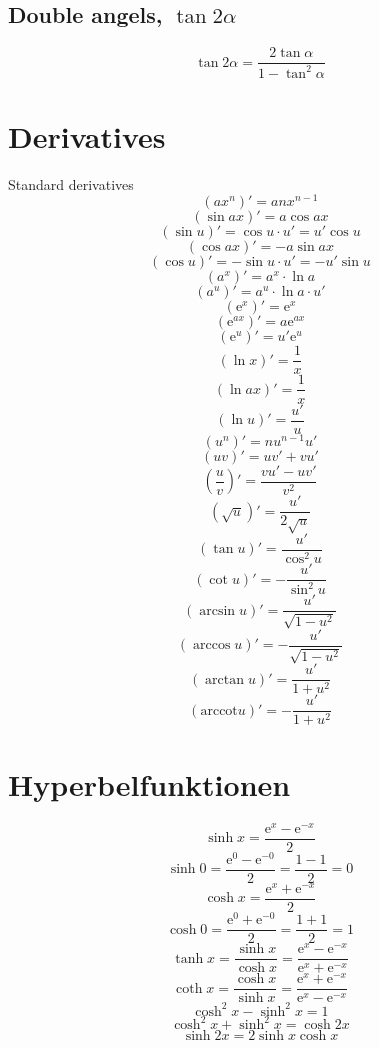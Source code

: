 \documentclass[a4paper, 10pt]{scrartcl}
\newcommand*\euler{\mathrm{e}}
\newcommand*\arccot{\mathrm{arccot}}
\begin{document}
\subsection{Double angels, $\tan{2\alpha}$}
\[\tan{2\alpha} = \frac{2\tan{\alpha}}{1 - \tan^{2}{\alpha}}\]

\section{Derivatives}

Standard derivatives
\[(ax^{n})' = anx^{n-1}\]
\[(\sin{ax})' = a\cos{ax}\]
\[(\sin{u})' = \cos{u}\cdot u' = u'\cos{u}\]
\[(\cos{ax})' = -a\sin{ax}\]
\[(\cos{u})' = -\sin{u}\cdot u' = -u'\sin{u}\]
\[(a^{x})' = a^{x}\cdot\ln{a}\]
\[(a^{u})' = a^{u}\cdot\ln{a}\cdot u'\]
\[(\euler^{x})' = \euler^{x}\]
\[(\euler^{ax})' = a\euler^{ax}\]
\[(\euler^{u})' = u'\euler^{u}\]
\[(\ln{x})' = \frac{1}{x}\]
\[(\ln{ax})' = \frac{1}{x}\]
\[(\ln{u})' = \frac{u'}{u}\]
\[(u^{n})' = nu^{n-1}u'\]
\[(uv)' = uv' + vu'\]
\[\left(\frac{u}{v}\right)' = \frac{vu' - uv'}{v^{2}}\]
\[\left(\sqrt{u}\right)' = \frac{u'}{2\sqrt{u}}\]
\[(\tan{u})' = \frac{u'}{\cos^{2}{u}}\]
\[(\cot{u})' = -\frac{u'}{\sin^{2}{u}}\]
\[(\arcsin{u})' = \frac{u'}{\sqrt{1 - u^{2}}}\]
\[(\arccos{u})' = -\frac{u'}{\sqrt{1 - u^{2}}}\]
\[(\arctan{u})' = \frac{u'}{1 + u^{2}}\]
\[(\arccot{u})' = -\frac{u'}{1 + u^{2}}\]

\section{Hyperbelfunktionen}
\[\sinh{x} = \frac{\euler^{x} - \euler^{-x}}{2}\]
\[\sinh{0} = \frac{\euler^{0} - \euler^{-0}}{2} = \frac{1 - 1}{2} = 0\]
\[\cosh{x} = \frac{\euler^{x} + \euler^{-x}}{2}\]
\[\cosh{0} = \frac{\euler^{0} + \euler^{-0}}{2} = \frac{1 + 1}{2} = 1\]
\[\tanh{x} = \frac{\sinh{x}}{\cosh{x}} = \frac{\euler^{x} - \euler^{-x}}{\euler^{x} + \euler^{-x}}\]
\[\coth{x} = \frac{\cosh{x}}{\sinh{x}} = \frac{\euler^{x} + \euler^{-x}}{\euler^{x} - \euler^{-x}}\]
\[\cosh^{2}{x} - \sinh^{2}{x} = 1\]
\[\cosh^{2}{x} + \sinh^{2}{x} = \cosh{2x}\]
\[\sinh{2x} = 2\sinh{x}\cosh{x}\]
\end{document}
